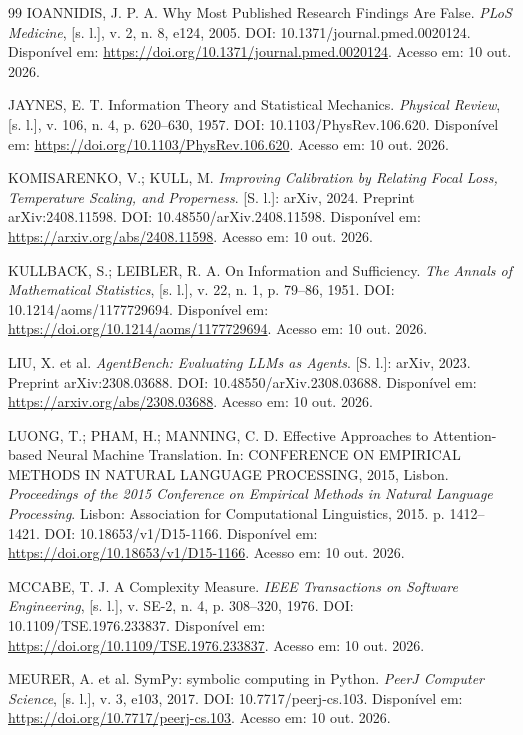 \begin{thebibliography}{99}
 IOANNIDIS, J. P. A. Why Most Published Research Findings Are False. \textit{PLoS Medicine}, [s. l.], v. 2, n. 8, e124, 2005. DOI: 10.1371/journal.pmed.0020124. Disponível em: \url{https://doi.org/10.1371/journal.pmed.0020124}. Acesso em: 10 out. 2026.

 JAYNES, E. T. Information Theory and Statistical Mechanics. \textit{Physical Review}, [s. l.], v. 106, n. 4, p. 620--630, 1957. DOI: 10.1103/PhysRev.106.620. Disponível em: \url{https://doi.org/10.1103/PhysRev.106.620}. Acesso em: 10 out. 2026.

 KOMISARENKO, V.; KULL, M. \textit{Improving Calibration by Relating Focal Loss, Temperature Scaling, and Properness}. [S. l.]: arXiv, 2024. Preprint arXiv:2408.11598. DOI: 10.48550/arXiv.2408.11598. Disponível em: \url{https://arxiv.org/abs/2408.11598}. Acesso em: 10 out. 2026.

 KULLBACK, S.; LEIBLER, R. A. On Information and Sufficiency. \textit{The Annals of Mathematical Statistics}, [s. l.], v. 22, n. 1, p. 79--86, 1951. DOI: 10.1214/aoms/1177729694. Disponível em: \url{https://doi.org/10.1214/aoms/1177729694}. Acesso em: 10 out. 2026.

 LIU, X. et al. \textit{AgentBench: Evaluating LLMs as Agents}. [S. l.]: arXiv, 2023. Preprint arXiv:2308.03688. DOI: 10.48550/arXiv.2308.03688. Disponível em: \url{https://arxiv.org/abs/2308.03688}. Acesso em: 10 out. 2026.

 LUONG, T.; PHAM, H.; MANNING, C. D. Effective Approaches to Attention-based Neural Machine Translation. In: CONFERENCE ON EMPIRICAL METHODS IN NATURAL LANGUAGE PROCESSING, 2015, Lisbon. \textit{Proceedings of the 2015 Conference on Empirical Methods in Natural Language Processing}. Lisbon: Association for Computational Linguistics, 2015. p. 1412--1421. DOI: 10.18653/v1/D15-1166. Disponível em: \url{https://doi.org/10.18653/v1/D15-1166}. Acesso em: 10 out. 2026.

 MCCABE, T. J. A Complexity Measure. \textit{IEEE Transactions on Software Engineering}, [s. l.], v. SE-2, n. 4, p. 308--320, 1976. DOI: 10.1109/TSE.1976.233837. Disponível em: \url{https://doi.org/10.1109/TSE.1976.233837}. Acesso em: 10 out. 2026.

 MEURER, A. et al. SymPy: symbolic computing in Python. \textit{PeerJ Computer Science}, [s. l.], v. 3, e103, 2017. DOI: 10.7717/peerj-cs.103. Disponível em: \url{https://doi.org/10.7717/peerj-cs.103}. Acesso em: 10 out. 2026.


\end{thebibliography}
